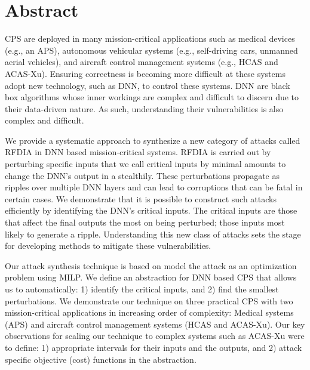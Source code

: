 
\chapter{Abstract}

\ac{CPS} are deployed in many mission-critical applications such as medical devices (e.g., an \ac{APS}), autonomous vehicular systems (e.g., self-driving cars, unmanned aerial vehicles), and aircraft control management systems (e.g.,  \ac{HCAS} and \ac{ACAS-Xu}). 
Ensuring correctness is becoming more difficult at these systems adopt new technology, such as \ac{DNN}, to control these systems. 
\ac{DNN} are black box algorithms whose inner workings are complex and difficult to discern due to their data-driven nature.
As such, understanding their vulnerabilities is also complex and difficult. 


We provide a systematic approach to synthesize a new category of attacks called \ac{RFDIA} in \ac{DNN} based mission-critical systems.
\ac{RFDIA} is carried out by perturbing specific inputs that we call critical inputs by minimal amounts to  change the \ac{DNN}'s output in a stealthily. These  perturbations propagate as ripples over multiple \ac{DNN} layers and can lead to corruptions that  can be fatal in certain cases. 
We demonstrate that it is possible  to construct such attacks efficiently by identifying the \ac{DNN}'s critical inputs. 
The critical inputs are those that  affect the final outputs the most on being perturbed; those inputs most likely to generate a ripple. 
Understanding this new class of attacks sets the stage for developing methods to mitigate these vulnerabilities. 

Our attack synthesis technique is based on model the attack as an optimization problem using \ac{MILP}.
We define an abstraction for \ac{DNN} based \ac{CPS} that allows us to automatically: 1) identify the critical inputs, and 2) find the smallest perturbations. 
We demonstrate our technique on three practical \ac{CPS} with two mission-critical applications in increasing order of complexity: Medical systems (\ac{APS}) and aircraft control management systems (\ac{HCAS} and \ac{ACAS-Xu}). 
Our key observations for scaling our technique to complex systems such as \ac{ACAS-Xu} were to define: 1) appropriate intervals for their inputs and the outputs, and 2) attack specific objective (cost) functions in the abstraction.  
 



